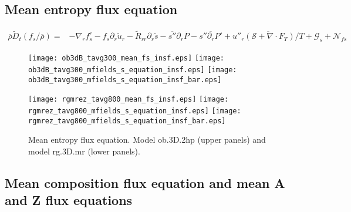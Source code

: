 \documentclass[10pt,paper=a4]{report}
\newcommand{\eht}{\overline}
\newcommand{\fht}{\widetilde}
\newcommand{\fav}{\widetilde}
\def\erho{\eht{\rho}}
\begin{document}
\newpage

\subsection{Mean entropy flux equation}

\begin{align}
\erho \fav{D}_t (f_s / \eht{\rho}) = &  -\nabla_r f_s^r - f_s \partial_r \fht{u}_r - \fht{R}_{rr} \partial_r \fht{s} -\eht{s''}\partial_r \eht{P} - \eht{s''\partial_r P'} + \eht{u''_r ( {\mathcal S} + \nabla \cdot F_T)  / T} + {\mathcal G_s} + {\mathcal N_{fs}}  \label{eq:rans_fs}
\end{align}

\begin{figure}[!h]
\centerline{
\texttt{[image: ob3dB\_tavg300\_mean\_fs\_insf.eps]}
\texttt{[image: ob3dB\_tavg300\_mfields\_s\_equation\_insf.eps]}
\texttt{[image: ob3dB\_tavg300\_mfields\_s\_equation\_insf\_bar.eps]}}

\centerline{
\texttt{[image: rgmrez\_tavg800\_mean\_fs\_insf.eps]}
\texttt{[image: rgmrez\_tavg800\_mfields\_s\_equation\_insf.eps]}
\texttt{[image: rgmrez\_tavg800\_mfields\_s\_equation\_insf\_bar.eps]}}
\caption{Mean entropy flux equation. Model {\sf ob.3D.2hp} (upper panels) and model {\sf rg.3D.mr} (lower panels). \label{fig:fs-equation}}
\end{figure}

\newpage

\subsection{Mean composition flux equation and mean A and Z flux equations}
\end{document}
